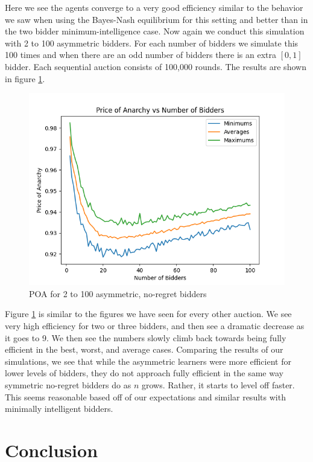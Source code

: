 \documentclass[12pt,twoside]{reedthesis}
\begin{document}
Here we see the agents converge to a very good efficiency similar to the behavior we saw when using the Bayes-Nash equilibrium for this setting and better than in the two bidder minimum-intelligence case. Now again we conduct this simulation with 2 to 100 asymmetric bidders. For each number of bidders we simulate this 100 times and when there are an odd number of bidders there is an extra $[0,1]$ bidder. Each sequential auction consists of 100,000 rounds. The results are shown in figure \ref{figure:asymmetric}.

\begin{figure}[h!]
	\centering
	\includegraphics[scale=.8]{Figures/asymmetric}
	\caption{POA for 2 to 100 asymmetric, no-regret bidders}
	\label{figure:asymmetric}
\end{figure}

Figure \ref{figure:asymmetric} is similar to the figures we  have seen for every other auction. We see very high efficiency for two or three bidders, and then see a dramatic decrease as it goes to 9. We then see the numbers slowly climb back towards being fully efficient in the best, worst, and average cases. Comparing the results of our simulations, we see that while the asymmetric learners were more efficient for lower levels of bidders, they do not approach fully efficient in the same way symmetric no-regret bidders do as $n$ grows. Rather, it starts to level off faster. This seems reasonable based off of our expectations and similar results with minimally intelligent bidders.

\chapter*{Conclusion}
	\setcounter{chapter}{4}
	\setcounter{section}{0}
	
\end{document}

